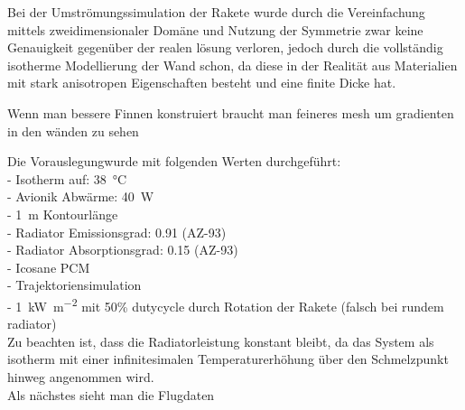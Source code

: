 Bei der Umströmungssimulation der Rakete wurde durch die Vereinfachung mittels zweidimensionaler Domäne und Nutzung der Symmetrie zwar keine
Genauigkeit gegenüber der realen lösung verloren, jedoch durch die vollständig isotherme Modellierung der Wand schon, da diese in der
Realität aus Materialien mit stark anisotropen Eigenschaften besteht und eine finite Dicke hat.


Wenn man bessere Finnen konstruiert braucht man feineres mesh um gradienten in den wänden zu sehen


Die Vorauslegungwurde mit folgenden Werten durchgeführt:\\
- Isotherm auf: \SI{38}{\celsius}\\
- Avionik Abwärme: \SI{40}{W}\\
- \SI{1}{m} Kontourlänge\\
- Radiator Emissionsgrad: \SI{0,91}{} (AZ-93)\\
- Radiator Absorptionsgrad: \SI{0,15}{} (AZ-93)\\
- Icosane PCM\\
- Trajektoriensimulation\\
- \SI{1}{\kilo\watt\per\meter\squared} mit 50\% dutycycle durch Rotation der Rakete (falsch bei rundem radiator)\\
Zu beachten ist, dass die Radiatorleistung konstant bleibt, da das System als isotherm mit einer
infinitesimalen Temperaturerhöhung über den Schmelzpunkt hinweg angenommen wird.\\
Als nächstes sieht man die Flugdaten 